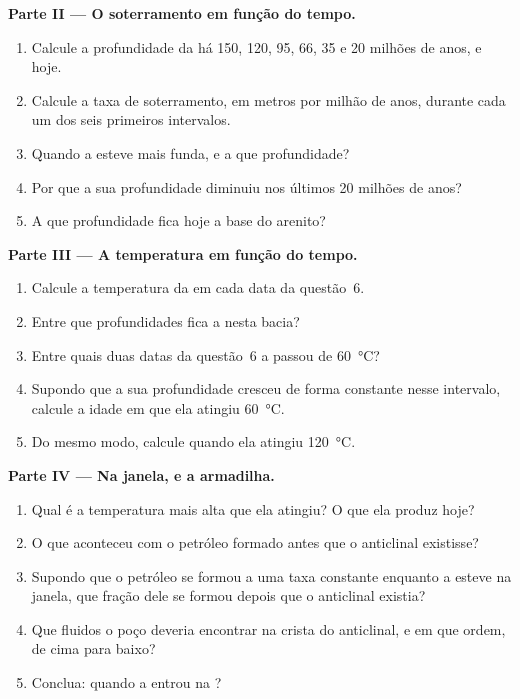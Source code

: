 \begin{problem}
\medskip
\noindent\textbf{Parte II --- O soterramento em função do tempo.}
\begin{enumerate}[resume]
  \item Calcule a profundidade da  há 150, 120, 95, 66, 35 e
        20 milhões de anos, e hoje.
  \item Calcule a taxa de soterramento, em metros por milhão de anos,
        durante cada um dos seis primeiros intervalos.
  \item Quando a  esteve mais funda, e a que profundidade?
  \item Por que a sua profundidade diminuiu nos últimos 20 milhões de anos?
  \item A que profundidade fica hoje a base do arenito?
\end{enumerate}

\medskip
\noindent\textbf{Parte III --- A temperatura em função do tempo.}
\begin{enumerate}[resume]
  \item Calcule a temperatura da  em cada data da
        questão~6.
  \item Entre que profundidades fica a  nesta bacia?
  \item Entre quais duas datas da questão~6 a  passou de
        \qty{60}{\degreeCelsius}?
  \item Supondo que a sua profundidade cresceu de forma constante nesse
        intervalo, calcule a idade em que ela atingiu \qty{60}{\degreeCelsius}.
  \item Do mesmo modo, calcule quando ela atingiu \qty{120}{\degreeCelsius}.
\end{enumerate}

\medskip
\noindent\textbf{Parte IV --- Na janela, e a armadilha.}
\begin{enumerate}[resume]
  \item Qual é a temperatura mais alta que ela atingiu? O que ela produz
        hoje?
  \item O que aconteceu com o petróleo formado antes que o anticlinal
        existisse?
  \item Supondo que o petróleo se formou a uma taxa constante enquanto a
         esteve na janela, que fração dele se formou depois
        que o anticlinal existia?
  \item Que fluidos o poço deveria encontrar na crista do anticlinal, e em
        que ordem, de cima para baixo?
  \item Conclua: quando a  entrou na ?
\end{enumerate}
\end{problem}
